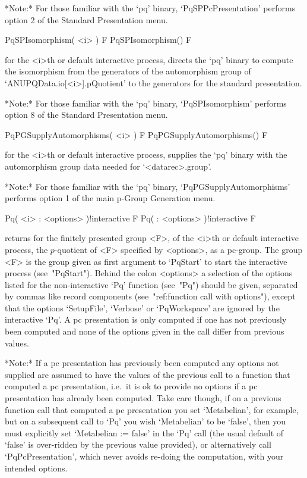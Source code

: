*Note:* For those familiar with  the  `pq'  binary,  `PqSPPcPresentation'
performs option 2 of the Standard Presentation menu.

\>PqSPIsomorphism( <i> ) F
\>PqSPIsomorphism() F

for the <i>th or default interactive {\ANUPQ} process, directs  the  `pq'
binary to compute the isomorphism from the generators of the automorphism
group of `ANUPQData.io[<i>].pQuotient' to the generators for the standard
presentation.

*Note:* For  those  familiar  with  the  `pq'  binary,  `PqSPIsomorphism'
performs option 8 of the Standard Presentation menu.

\>PqPGSupplyAutomorphisms( <i> ) F
\>PqPGSupplyAutomorphisms() F

for the <i>th or default interactive {\ANUPQ} process, supplies the  `pq'
binary with the automorphism group data needed for `<datarec>.group'.

*Note:*
For  those  familiar  with  the  `pq'  binary,  `PqPGSupplyAutomorphisms'
performs option 1 of the main p-Group Generation menu.


\>Pq( <i> : <options> )!{interactive} F
\>Pq( : <options> )!{interactive} F

returns for the finitely presented group <F>, of  the  <i>th  or  default
interactive {\ANUPQ}  process,  the  $p$-quotient  of  <F>  specified  by
<options>, as a pc-group. The group <F>  is  the  group  given  as  first
argument  to  `PqStart'  to  start  the  interactive   {\ANUPQ}   process
(see~"PqStart"). Behind the colon <options> a selection  of  the  options
listed for the non-interactive `Pq' function (see~"Pq") should be  given,
separated by commas like record components (see~"ref:function  call  with
options"),  except   that   the   options   `SetupFile',   `Verbose'   or
`PqWorkspace' are ignored by the interactive `Pq'. A pc  presentation  is
only computed if one has not previously been computed  and  none  of  the
options given in the call differ from previous values.

*Note:*
If a pc  presentation  has  previously  been  computed  any  options  not
supplied are assumed to have  the  values  of  the  previous  call  to  a
function that computed a pc presentation, i.e.~it is  ok  to  provide  no
options if a pc presentation has already been computed. Take care though,
if on a previous function call that computed a pc  presentation  you  set
`Metabelian', for example, but on a subsequent  call  to  `Pq'  you  wish
`Metabelian' to be `false', then you must explicitly set  `Metabelian  :=
false' in the `Pq' call (the usual default of `false' is  over-ridden  by
the previous value provided), or alternatively  call  `PqPcPresentation',
which never avoids re-doing the computation, with your intended options.

